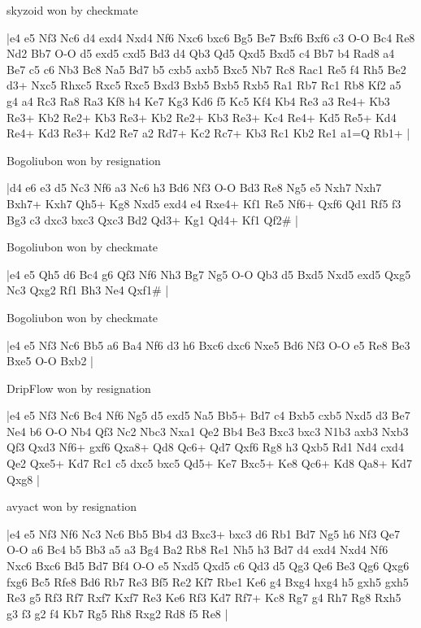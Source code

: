 \showboard

skyzoid won by checkmate

\makegametitle
|e4 e5 Nf3 Nc6 d4 exd4 Nxd4 Nf6 Nxc6 bxc6 Bg5 Be7 Bxf6 Bxf6 c3 O-O Bc4 Re8 Nd2 Bb7 O-O d5 exd5 cxd5 Bd3 d4 Qb3 Qd5 Qxd5 Bxd5 c4 Bb7 b4 Rad8 a4 Be7 c5 c6 Nb3 Bc8 Na5 Bd7 b5 cxb5 axb5 Bxc5 Nb7 Rc8 Rac1 Re5 f4 Rh5 Be2 d3+ Nxc5 Rhxc5 Rxc5 Rxc5 Bxd3 Bxb5 Bxb5 Rxb5 Ra1 Rb7 Rc1 Rb8 Kf2 a5 g4 a4 Rc3 Ra8 Ra3 Kf8 h4 Ke7 Kg3 Kd6 f5 Kc5 Kf4 Kb4 Re3 a3 Re4+ Kb3 Re3+ Kb2 Re2+ Kb3 Re3+ Kb2 Re2+ Kb3 Re3+ Kc4 Re4+ Kd5 Re5+ Kd4 Re4+ Kd3 Re3+ Kd2 Re7 a2 Rd7+ Kc2 Rc7+ Kb3 Rc1 Kb2 Re1 a1=Q Rb1+  |

\showboard

Bogoliubon won by resignation

\makegametitle
|d4 e6 e3 d5 Nc3 Nf6 a3 Nc6 h3 Bd6 Nf3 O-O Bd3 Re8 Ng5 e5 Nxh7 Nxh7 Bxh7+ Kxh7 Qh5+ Kg8 Nxd5 exd4 e4 Rxe4+ Kf1 Re5 Nf6+ Qxf6 Qd1 Rf5 f3 Bg3 c3 dxc3 bxc3 Qxc3 Bd2 Qd3+ Kg1 Qd4+ Kf1 Qf2\#  |

\showboard

Bogoliubon won by checkmate

\makegametitle
|e4 e5 Qh5 d6 Bc4 g6 Qf3 Nf6 Nh3 Bg7 Ng5 O-O Qb3 d5 Bxd5 Nxd5 exd5 Qxg5 Nc3 Qxg2 Rf1 Bh3 Ne4 Qxf1\#  |

\showboard

Bogoliubon won by checkmate

\makegametitle
|e4 e5 Nf3 Nc6 Bb5 a6 Ba4 Nf6 d3 h6 Bxc6 dxc6 Nxe5 Bd6 Nf3 O-O e5 Re8 Be3 Bxe5 O-O Bxb2  |

\showboard

DripFlow won by resignation

\makegametitle
|e4 e5 Nf3 Nc6 Bc4 Nf6 Ng5 d5 exd5 Na5 Bb5+ Bd7 c4 Bxb5 cxb5 Nxd5 d3 Be7 Ne4 b6 O-O Nb4 Qf3 Nc2 Nbc3 Nxa1 Qe2 Bb4 Be3 Bxc3 bxc3 N1b3 axb3 Nxb3 Qf3 Qxd3 Nf6+ gxf6 Qxa8+ Qd8 Qc6+ Qd7 Qxf6 Rg8 h3 Qxb5 Rd1 Nd4 cxd4 Qe2 Qxe5+ Kd7 Rc1 c5 dxc5 bxc5 Qd5+ Ke7 Bxc5+ Ke8 Qc6+ Kd8 Qa8+ Kd7 Qxg8  |

\showboard

avyact won by resignation

\makegametitle
|e4 e5 Nf3 Nf6 Nc3 Nc6 Bb5 Bb4 d3 Bxc3+ bxc3 d6 Rb1 Bd7 Ng5 h6 Nf3 Qe7 O-O a6 Bc4 b5 Bb3 a5 a3 Bg4 Ba2 Rb8 Re1 Nh5 h3 Bd7 d4 exd4 Nxd4 Nf6 Nxc6 Bxc6 Bd5 Bd7 Bf4 O-O e5 Nxd5 Qxd5 c6 Qd3 d5 Qg3 Qe6 Be3 Qg6 Qxg6 fxg6 Bc5 Rfe8 Bd6 Rb7 Re3 Bf5 Re2 Kf7 Rbe1 Ke6 g4 Bxg4 hxg4 h5 gxh5 gxh5 Re3 g5 Rf3 Rf7 Rxf7 Kxf7 Re3 Ke6 Rf3 Kd7 Rf7+ Kc8 Rg7 g4 Rh7 Rg8 Rxh5 g3 f3 g2 f4 Kb7 Rg5 Rh8 Rxg2 Rd8 f5 Re8  |

